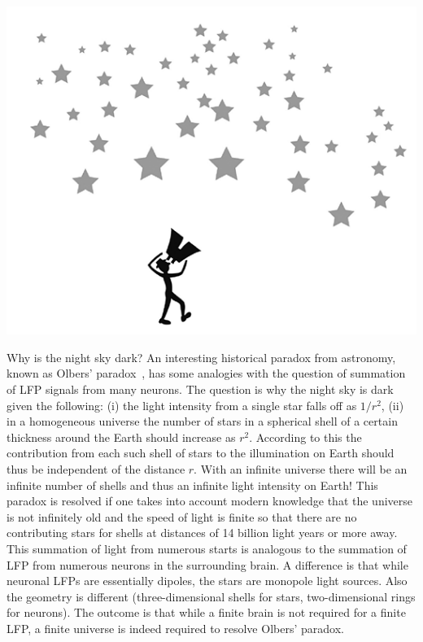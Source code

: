 \subsubsection{}
%
\begin{center}
\includegraphics{Figures/LFP/LFP-night-sky-w90-r150}
\end{center}
\vspace*{6pt}
%
Why is the night sky dark? An interesting historical paradox from astronomy, known as Olbers' paradox~\citep{Harrison1989}, has some analogies with the question of summation of LFP signals from many neurons. The question is why the night sky is dark given the following:
(i) the light intensity from a single star falls off as $1/r^2$, (ii) in a homogeneous universe the number of stars in a spherical shell of a certain thickness around the Earth should increase as $r^2$. According to this the contribution from each such shell of stars to the illumination on Earth should thus be independent of the distance $r$. With an infinite universe there will be an infinite number of shells and thus an infinite light intensity on Earth! This paradox is resolved if one takes into account modern knowledge that the universe is not infinitely old and the speed of light is finite so that there are no contributing stars for shells at distances of 14 billion light years or more away. This summation of light from numerous starts is analogous to the summation of LFP from numerous neurons in the surrounding brain. A difference is that while neuronal LFPs are essentially dipoles, the stars are monopole light sources. Also the geometry is different (three-dimensional shells for stars, two-dimensional rings for neurons). The outcome is that while a finite brain is not required for a finite LFP, a finite universe is indeed required to resolve Olbers' paradox.

